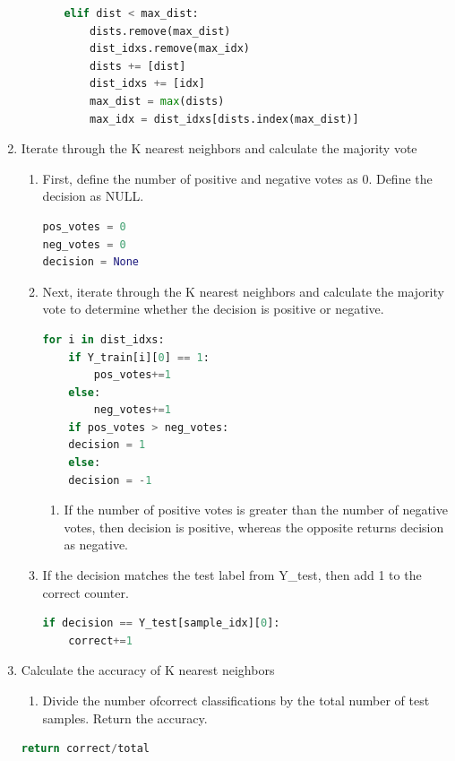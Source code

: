 \documentclass[11pt]{article}
\theoremstyle{definition}
\begin{document}
\begin{enumerate}
\begin{enumerate}
\begin{enumerate}
\begin{lstlisting}[language=python, frame=single]
elif dist < max_dist:
    dists.remove(max_dist)
    dist_idxs.remove(max_idx)
    dists += [dist]
    dist_idxs += [idx]
    max_dist = max(dists)
    max_idx = dist_idxs[dists.index(max_dist)]
    \end{lstlisting}
 \end{enumerate}
\end{enumerate}
\item Iterate through the K nearest neighbors and calculate the majority vote
 \begin{enumerate}
     \item First, define the number of positive and negative votes as 0. Define the \textsf{decision} as NULL.
\begin{lstlisting}[language = python, frame = single]
pos_votes = 0
neg_votes = 0
decision = None
\end{lstlisting}
    \item Next, iterate through the K nearest neighbors and calculate the majority vote to determine whether the \textsf{decision} is positive or negative.
\begin{lstlisting}[language=python, frame=single]
for i in dist_idxs:
    if Y_train[i][0] == 1:
    	pos_votes+=1
    else:
    	neg_votes+=1
    if pos_votes > neg_votes:
    decision = 1
    else:
    decision = -1
\end{lstlisting}
        \begin{enumerate}
            \item If the number of positive votes is greater than the number of negative votes, then \textsf{decision} is positive, whereas the opposite returns \textsf{decision} as negative.
        \end{enumerate}
        \item If the \textsf{decision} matches the test label from \textsf{Y\_test}, then add 1 to the \textsf{correct} counter.
\begin{lstlisting}[language=python, frame=single]
if decision == Y_test[sample_idx][0]:
	correct+=1
\end{lstlisting}
\end{enumerate}
\item Calculate the accuracy of \textsf{K} nearest neighbors
    \begin{enumerate}
        \item Divide the number of\textsf{correct} classifications by the \textsf{total} number of test samples. Return the accuracy.
    \end{enumerate}
\begin{lstlisting}[language=python, frame=single]
return correct/total
\end{lstlisting}
\end{enumerate}
\end{document}
